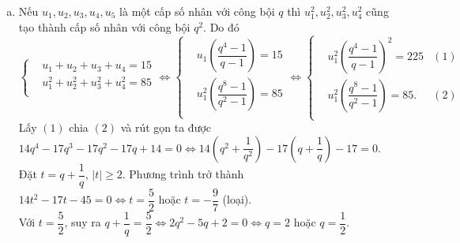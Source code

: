 \begin{bt}
{\begin{enumerate}[a)]
			\item Nếu $u_1,u_2,u_3,u_4,u_5$ là một cấp số nhân với công bội $q$ thì $u_1^2,u_2^2,u_3^2,u_4^2$ cũng tạo thành cấp số nhân với công bội $q^2$. Do đó\\ $\left\{\begin{aligned} 
				&u_1+u_2+u_3+u_4=15 \\ 
				&u_1^2+u_2^2+u_3^2+u_4^2=85 \\
			\end{aligned}\right. \Leftrightarrow \left\{\begin{aligned} 
				&u_1\left(\dfrac{q^4-1}{q-1}\right)=15 \\ 
				&u_1^2\left(\dfrac{q^8-1}{q^2-1}\right)=85 \\
			\end{aligned}\right. \Leftrightarrow \left\{\begin{aligned}& u_1^2{\left(\dfrac{q^4-1}{q-1}\right)}^2=225 & (1) \\ & u_1^2\left(\dfrac{q^8-1}{q^2-1}\right)=85. & (2) \\ \end{aligned}\right. $ \\ 
			Lấy $(1)$ chia $(2)$ và rút gọn ta được\\ $14q^4-17q^3-17q^2-17q+14=0 \Leftrightarrow 14\left(q^2+\dfrac{1}{q^2}\right)-17\left(q+\dfrac{1}{q}\right)-17=0$. \\ 
			Đặt $t=q+\dfrac{1}{q}$, $\left|t\right|\geqslant 2$. Phương trình trở thành\\ $14t^2-17t-45=0 \Leftrightarrow t=\dfrac{5}{2}$ hoặc $t=-\dfrac{9}{7}$ (loại). \\ 
			Với $t=\dfrac{5}{2}$, suy ra $q+\dfrac{1}{q}=\dfrac{5}{2} \Leftrightarrow 2q^2-5q+2=0 \Leftrightarrow q=2$ hoặc $q=\dfrac{1}{2}$. 
		\end{enumerate}
	}
\end{bt}

